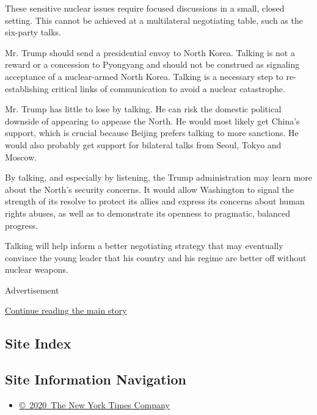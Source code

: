 These sensitive nuclear issues require focused discussions in a small,
closed setting. This cannot be achieved at a multilateral negotiating
table, such as the six-party talks.

Mr. Trump should send a presidential envoy to North Korea. Talking is
not a reward or a concession to Pyongyang and should not be construed as
signaling acceptance of a nuclear-armed North Korea. Talking is a
necessary step to re-establishing critical links of communication to
avoid a nuclear catastrophe.

Mr. Trump has little to lose by talking. He can risk the domestic
political downside of appearing to appease the North. He would most
likely get China's support, which is crucial because Beijing prefers
talking to more sanctions. He would also probably get support for
bilateral talks from Seoul, Tokyo and Moscow.

By talking, and especially by listening, the Trump administration may
learn more about the North's security concerns. It would allow
Washington to signal the strength of its resolve to protect its allies
and express its concerns about human rights abuses, as well as to
demonstrate its openness to pragmatic, balanced progress.

Talking will help inform a better negotiating strategy that may
eventually convince the young leader that his country and his regime are
better off without nuclear weapons.

Advertisement

\protect\hyperlink{after-bottom}{Continue reading the main story}

\hypertarget{site-index}{%
\subsection{Site Index}\label{site-index}}

\hypertarget{site-information-navigation}{%
\subsection{Site Information
Navigation}\label{site-information-navigation}}

\begin{itemize}
\tightlist
\item
  \href{https://help.nytimes3xbfgragh.onion/hc/en-us/articles/115014792127-Copyright-notice}{©~2020~The
  New York Times Company}
\end{itemize}

